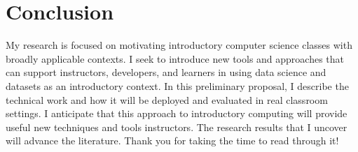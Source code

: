 \section{Conclusion}

My research is focused on motivating introductory computer science classes with broadly applicable contexts.
I seek to introduce new tools and approaches that can support instructors, developers, and learners in using data science and datasets as an introductory context.
In this preliminary proposal, I describe the technical work and how it will be deployed and evaluated in real classroom settings.
I anticipate that this approach to introductory computing will provide useful new techniques and tools instructors.
The research results that I uncover will advance the literature.
Thank you for taking the time to read through it!